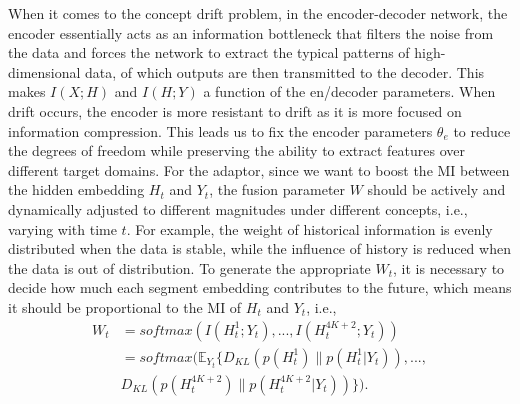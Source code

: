 \documentclass[sigconf]{acmart}
\begin{document}
When it comes to the concept drift problem, in the encoder-decoder network, the encoder essentially acts as an information bottleneck that filters the noise from the data and forces the network to extract the typical patterns of high-dimensional data, of which outputs are then transmitted to the decoder. This makes $I(X;H)$ and $I(H;Y)$ a function of the en/decoder parameters. When drift occurs, the encoder is more resistant to drift as it is more focused on information compression. This leads us to fix the encoder parameters $\theta_e$ to reduce the degrees of freedom while preserving the ability to extract features over different target domains. For the adaptor, since we want to boost the MI between the hidden embedding $\mathit{H}_t$ and $Y_t$, the fusion parameter $W$ should be actively and dynamically adjusted to different magnitudes under different concepts, i.e., varying with time $t$. For example, the weight of historical information is evenly distributed when the data is stable, while the influence of history is reduced when the data is out of distribution. To generate the appropriate $W_t$, it is necessary to decide how much each segment embedding contributes to the future, which means it should be proportional to the MI of $\mathit{H}_t$ and $Y_t$, i.e.,
\begin{equation}
\begin{aligned}
    W_t &= softmax(I(\mathit{H}_t^1;Y_t), ..., I(\mathit{H}_t^{4K+2};Y_t))\\
          &= softmax(\mathbb{E}_{Y_t}\{D_{KL}(p(\mathit{H}_t^1)\|p(\mathit{H}_t^1|Y_t)), ...,\\ &D_{KL}(p(\mathit{H}_t^{4K+2})\|p(\mathit{H}_t^{4K+2}|Y_t))\}).
\end{aligned}
\label{eq:MI}
\end{equation}
\end{document}
